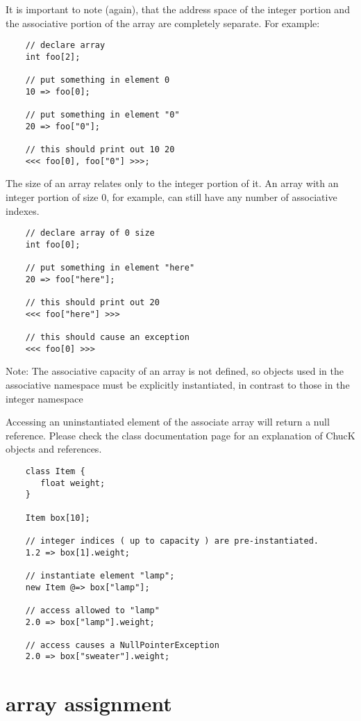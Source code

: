 It is important to note (again), that the address space of the integer portion and the associative portion of the array are completely separate. For example:
\begin{verbatim}
    // declare array
    int foo[2];

    // put something in element 0
    10 => foo[0];

    // put something in element "0"
    20 => foo["0"];

    // this should print out 10 20
    <<< foo[0], foo["0"] >>>;
\end{verbatim}

The size of an array relates only to the integer portion of it. An array with an integer portion of size 0, for example, can still have any number of associative indexes.
\begin{verbatim}
    // declare array of 0 size
    int foo[0];

    // put something in element "here"
    20 => foo["here"];

    // this should print out 20
    <<< foo["here"] >>>

    // this should cause an exception
    <<< foo[0] >>>
\end{verbatim}

Note: The associative capacity of an array is not defined, so objects used in the associative namespace must be explicitly instantiated, in contrast to those in the integer namespace

 Accessing an uninstantiated element of the associate array will return a null reference. Please check the class documentation page for an explanation of ChucK objects and references.
\begin{verbatim}
    class Item { 
       float weight; 
    }
    
    Item box[10]; 

    // integer indices ( up to capacity ) are pre-instantiated.
    1.2 => box[1].weight; 

    // instantiate element "lamp";
    new Item @=> box["lamp"]; 

    // access allowed to "lamp"
    2.0 => box["lamp"].weight; 

    // access causes a NullPointerException    
    2.0 => box["sweater"].weight; 
\end{verbatim}
 

\section{array assignment}

